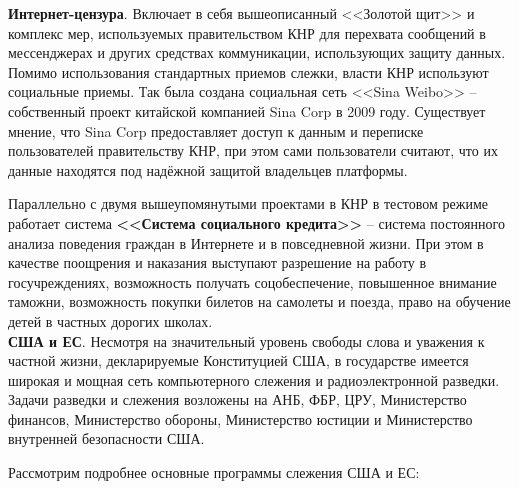 	\textbf{Интернет-цензура}. Включает в себя вышеописанный <<Золотой щит>> и комплекс мер, используемых правительством КНР для перехвата сообщений в мессенджерах и других средствах коммуникации, использующих защиту данных. 	Помимо использования стандартных приемов слежки, власти КНР используют социальные приемы. Так была создана социальная сеть <<Sina Weibo>> -- собственный проект китайской компанией Sina Corp в 2009 году. Существует мнение, что Sina Corp предоставляет доступ к данным и переписке пользователей правительству КНР, при этом сами пользователи считают, что их данные находятся под надёжной защитой владельцев платформы. 
	
	Параллельно с двумя вышеупомянутыми проектами в КНР в тестовом режиме работает система \textbf{<<Система социального кредита>>} -- система постоянного анализа поведения граждан в Интернете и в повседневной жизни. При этом в качестве поощрения и наказания выступают разрешение на работу в госучреждениях, возможность получать соцобеспечение, повышенное внимание таможни, возможность покупки билетов на самолеты и поезда, право на обучение детей в частных дорогих школах.  \cite{SocialCredit} \cite{SocialCredit2} %
	\\
	
	\textbf{США и ЕС}. Несмотря на значительный уровень свободы слова и уважения к частной жизни, декларируемые Конституцией США, в государстве имеется широкая и мощная сеть компьютерного слежения и радиоэлектронной разведки. Задачи разведки  и слежения возложены на АНБ, ФБР, ЦРУ, Министерство финансов, Министерство обороны, Министерство юстиции и Министерство внутренней безопасности США.  
	
	Рассмотрим подробнее основные программы слежения США и ЕС:
	
